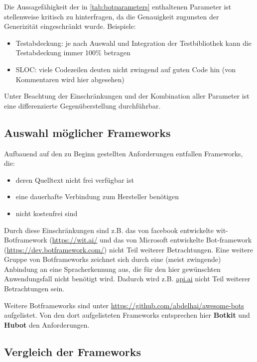 Die Aussagefähigkeit der in \autoref{tab:botparameters} enthaltenen Parameter ist stellenweise kritisch zu hinterfragen, da die Genauigkeit zugunsten der Generizität eingeschränkt wurde. 
Beispiele:
\begin{itemize}
    \item Testabdeckung: je nach Auswahl und Integration der Testbibliothek kann die Testabdeckung immer 100\% betragen
\item SLOC: viele Codezeilen deuten nicht zwingend auf guten Code hin (von Kommentaren wird hier abgesehen)
\end{itemize}

Unter Beachtung der Einschränkungen und der Kombination aller Parameter ist eine differenzierte Gegenüberstellung durchführbar.

\subsection{Auswahl möglicher Frameworks}

Aufbauend auf den zu Beginn gestellten Anforderungen entfallen Frameworks, die:
\begin{itemize}
    \item deren Quelltext nicht frei verfügbar ist
    \item eine dauerhafte Verbindung zum Hersteller benötigen
    \item nicht kostenfrei sind
\end{itemize}

Durch diese Einschränkungen sind z.B. das von facebook entwickelte wit-Botframework (\url{https://wit.ai/} und das von Microsoft entwickelte Bot-framework (\url{https://dev.botframework.com/}) nicht Teil weiterer Betrachtungen.
Eine weitere Gruppe von Botframeworks zeichnet sich durch eine (meist zwingende) Anbindung an eine Spracherkennung aus, die für den hier gewünschten Anwendungsfall nicht benötigt wird. Dadurch wird z.B. \url{api.ai} nicht Teil weiterer Betrachtungen sein.


Weitere Botframeworks sind unter \url{https://github.com/abdelhai/awesome-bots} aufgelistet. 
Von den dort aufgelisteten Frameworks entsprechen hier \textbf{Botkit} und \textbf{Hubot} den Anforderungen.

\subsection{Vergleich der Frameworks}

